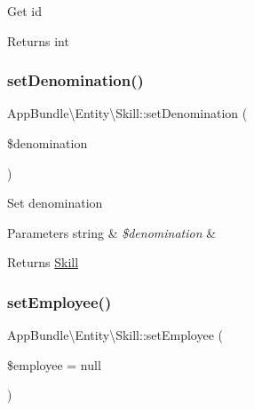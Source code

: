 Get id

\begin{DoxyReturn}{Returns}
int 
\end{DoxyReturn}
\mbox{\label{class_app_bundle_1_1_entity_1_1_skill_ac6d7d4286476c5d583d190533e9425a6}} 
\subsubsection{\texorpdfstring{set\+Denomination()}{setDenomination()}}
{\footnotesize\ttfamily App\+Bundle\textbackslash{}\+Entity\textbackslash{}\+Skill\+::set\+Denomination (\begin{DoxyParamCaption}\item[{}]{\$denomination }\end{DoxyParamCaption})}

Set denomination


\begin{DoxyParams}[1]{Parameters}
string & {\em \$denomination} & \\
\hline
\end{DoxyParams}
\begin{DoxyReturn}{Returns}
\mbox{\hyperlink{class_app_bundle_1_1_entity_1_1_skill}{Skill}} 
\end{DoxyReturn}
\mbox{\label{class_app_bundle_1_1_entity_1_1_skill_a8c92b9e81fa71efafd400645b4adb1b8}} 
\subsubsection{\texorpdfstring{set\+Employee()}{setEmployee()}}
{\footnotesize\ttfamily App\+Bundle\textbackslash{}\+Entity\textbackslash{}\+Skill\+::set\+Employee (\begin{DoxyParamCaption}\item[{\textbackslash{}\mbox{\hyperlink{class_app_bundle_1_1_entity_1_1_employee}{App\+Bundle\textbackslash{}\+Entity\textbackslash{}\+Employee}}}]{\$employee = {\ttfamily null} }\end{DoxyParamCaption})}

